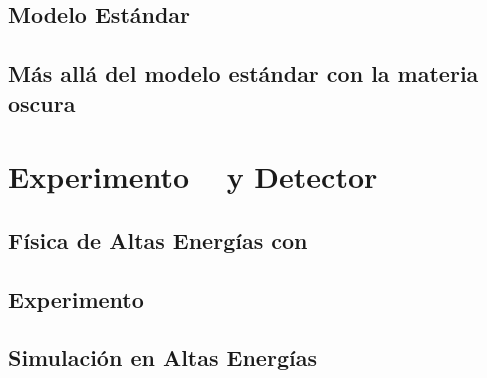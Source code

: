 \documentclass[12pt]{report}
\begin{document}
	\section{Modelo Estándar} 	
	

	\section{M\'as all\'a del modelo est\'andar con la materia oscura}
	
	
				


\chapter{Experimento \LHC ~ y Detector \CMS}

		
	\section{Física de Altas Energías con \LHC}
	
	
	\section{Experimento \CMS}\label{Experimento_CMS}
	

		
	\section{Simulación en Altas Energías}
	
	
	

\end{document}
